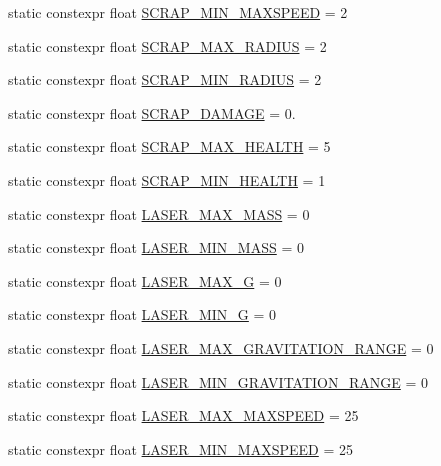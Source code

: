 \begin{DoxyCompactItemize}
\item 
static constexpr float \hyperlink{class_act_conf_a010191bef8eca8eea3ed78cc5841fed6}{S\+C\+R\+A\+P\+\_\+\+M\+I\+N\+\_\+\+M\+A\+X\+S\+P\+E\+E\+D} = 2
\item 
static constexpr float \hyperlink{class_act_conf_a06e5824b72a7d1b80da8545e389234f2}{S\+C\+R\+A\+P\+\_\+\+M\+A\+X\+\_\+\+R\+A\+D\+I\+U\+S} = 2
\item 
static constexpr float \hyperlink{class_act_conf_afe61b0f80b163325f965ad9c7835e2a4}{S\+C\+R\+A\+P\+\_\+\+M\+I\+N\+\_\+\+R\+A\+D\+I\+U\+S} = 2
\item 
static constexpr float \hyperlink{class_act_conf_a940e6fbaa1f93fe8f39c303eee646466}{S\+C\+R\+A\+P\+\_\+\+D\+A\+M\+A\+G\+E} = 0.
\item 
static constexpr float \hyperlink{class_act_conf_ab74a900ac35ead3064251ec3b2a3044d}{S\+C\+R\+A\+P\+\_\+\+M\+A\+X\+\_\+\+H\+E\+A\+L\+T\+H} = 5
\item 
static constexpr float \hyperlink{class_act_conf_ad1832e09b6b2b9bde0b2b354e998a39b}{S\+C\+R\+A\+P\+\_\+\+M\+I\+N\+\_\+\+H\+E\+A\+L\+T\+H} = 1
\item 
static constexpr float \hyperlink{class_act_conf_ab40d08f0b16d79f814df80dce3d68f0b}{L\+A\+S\+E\+R\+\_\+\+M\+A\+X\+\_\+\+M\+A\+S\+S} = 0
\item 
static constexpr float \hyperlink{class_act_conf_aa91df73e67c99df1c57f086903e2ef0f}{L\+A\+S\+E\+R\+\_\+\+M\+I\+N\+\_\+\+M\+A\+S\+S} = 0
\item 
static constexpr float \hyperlink{class_act_conf_a6beb7023724c462dde4759b1d9b71523}{L\+A\+S\+E\+R\+\_\+\+M\+A\+X\+\_\+\+G} = 0
\item 
static constexpr float \hyperlink{class_act_conf_a544a1db0e9d6f7460b9e830454bb7c6e}{L\+A\+S\+E\+R\+\_\+\+M\+I\+N\+\_\+\+G} = 0
\item 
static constexpr float \hyperlink{class_act_conf_a43c5e26c88265b38ad7d511aaee09943}{L\+A\+S\+E\+R\+\_\+\+M\+A\+X\+\_\+\+G\+R\+A\+V\+I\+T\+A\+T\+I\+O\+N\+\_\+\+R\+A\+N\+G\+E} = 0
\item 
static constexpr float \hyperlink{class_act_conf_a69be0267b8fee7cc2402284ef993c088}{L\+A\+S\+E\+R\+\_\+\+M\+I\+N\+\_\+\+G\+R\+A\+V\+I\+T\+A\+T\+I\+O\+N\+\_\+\+R\+A\+N\+G\+E} = 0
\item 
static constexpr float \hyperlink{class_act_conf_a9ffd4194046774f1aab2f478dabbd71d}{L\+A\+S\+E\+R\+\_\+\+M\+A\+X\+\_\+\+M\+A\+X\+S\+P\+E\+E\+D} = 25
\item 
static constexpr float \hyperlink{class_act_conf_abb2a1192a6fda9c96c16958a4be49380}{L\+A\+S\+E\+R\+\_\+\+M\+I\+N\+\_\+\+M\+A\+X\+S\+P\+E\+E\+D} = 25

\end{DoxyCompactItemize}

